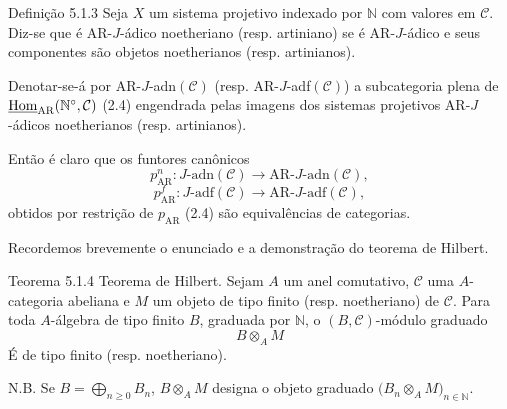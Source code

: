 \begin{statement}{Definição 5.1.3}
Seja \(X\) um sistema projetivo indexado por \(\mathbb N\) com valores em \(\mathcal C\). Diz-se que é AR-\(J\)-ádico noetheriano (resp. artiniano) se é AR-\(J\)-ádico e seus componentes são objetos noetherianos (resp. artinianos).
\end{statement}

Denotar-se-á por AR-\(J\)-adn\((\mathcal C)\) (resp. AR-\(J\)-adf\((\mathcal C)\)) a subcategoria plena de \(\underline{\operatorname{Hom}}_{\mathrm{AR}}(\mathbb N^\circ,\mathcal C)\) (2.4) engendrada pelas imagens dos sistemas projetivos AR-\(J\)-ádicos noetherianos (resp. artinianos).

Então é claro que os funtores canônicos
\[
p^n_{\mathrm{AR}}:J\text{-adn}(\mathcal C)\longrightarrow \mathrm{AR}\text{-}J\text{-adn}(\mathcal C),
\]
\[
p^f_{\mathrm{AR}}:J\text{-adf}(\mathcal C)\longrightarrow \mathrm{AR}\text{-}J\text{-adf}(\mathcal C),
\]
obtidos por restrição de \(p_{\mathrm{AR}}\) (2.4) são equivalências de categorias.

Recordemos brevemente o enunciado e a demonstração do teorema de Hilbert.

\begin{statement}{Teorema 5.1.4}
Teorema de Hilbert. Sejam \(A\) um anel comutativo, \(\mathcal C\) uma \(A\)-categoria abeliana e \(M\) um objeto de tipo finito (resp. noetheriano) de \(\mathcal C\). Para toda \(A\)-álgebra de tipo finito \(B\), graduada por \(\mathbb N\), o \((B,\mathcal C)\)-módulo graduado
\[
B\otimes_A M
\]
É de tipo finito (resp. noetheriano).

N.B. Se \(B=\bigoplus_{n\ge0}B_n\), \(B\otimes_A M\) designa o objeto graduado \(\bigl(B_n\otimes_A M\bigr)_{n\in\mathbb N}\).
\end{statement}
